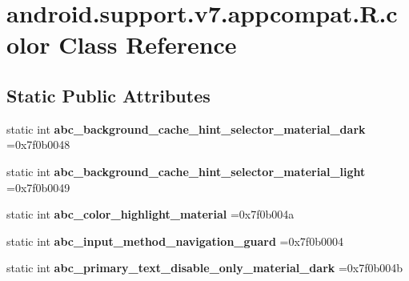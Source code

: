 \hypertarget{classandroid_1_1support_1_1v7_1_1appcompat_1_1R_1_1color}{}\section{android.\+support.\+v7.\+appcompat.\+R.\+color Class Reference}
\label{classandroid_1_1support_1_1v7_1_1appcompat_1_1R_1_1color}
\subsection*{Static Public Attributes}
\begin{DoxyCompactItemize}
\item 
\mbox{\label{classandroid_1_1support_1_1v7_1_1appcompat_1_1R_1_1color_a288d08691274a7c9c05d96f87f55697d}} 
static int {\bfseries abc\+\_\+background\+\_\+cache\+\_\+hint\+\_\+selector\+\_\+material\+\_\+dark} =0x7f0b0048
\item 
\mbox{\label{classandroid_1_1support_1_1v7_1_1appcompat_1_1R_1_1color_a7d81ebb52368fdad881e6ef616823289}} 
static int {\bfseries abc\+\_\+background\+\_\+cache\+\_\+hint\+\_\+selector\+\_\+material\+\_\+light} =0x7f0b0049
\item 
\mbox{\label{classandroid_1_1support_1_1v7_1_1appcompat_1_1R_1_1color_a781165c81982a3f7406fb40603b0b8ed}} 
static int {\bfseries abc\+\_\+color\+\_\+highlight\+\_\+material} =0x7f0b004a
\item 
\mbox{\label{classandroid_1_1support_1_1v7_1_1appcompat_1_1R_1_1color_a13e81bccaf28d73741498937f2ad1dfc}} 
static int {\bfseries abc\+\_\+input\+\_\+method\+\_\+navigation\+\_\+guard} =0x7f0b0004
\item 
\mbox{\label{classandroid_1_1support_1_1v7_1_1appcompat_1_1R_1_1color_ab01c6c0a04b88e68ffa4a0def910f2df}} 
static int {\bfseries abc\+\_\+primary\+\_\+text\+\_\+disable\+\_\+only\+\_\+material\+\_\+dark} =0x7f0b004b
\item 
\mbox{\label{classandroid_1_1support_1_1v7_1_1appcompat_1_1R_1_1color_a0f1db7a823ec377f71290671085bcaa8}} 

\end{DoxyCompactItemize}
